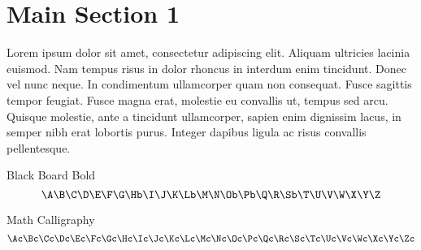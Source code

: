
\section{Main Section 1}

Lorem ipsum dolor sit amet, consectetur adipiscing elit. Aliquam ultricies lacinia euismod. Nam tempus risus in dolor rhoncus in interdum enim tincidunt. Donec vel nunc neque. In condimentum ullamcorper quam non consequat. Fusce sagittis tempor feugiat. Fusce magna erat, molestie eu convallis ut, tempus sed arcu. Quisque molestie, ante a tincidunt ullamcorper, sapien enim dignissim lacus, in semper nibh erat lobortis purus. Integer dapibus ligula ac risus convallis pellentesque.

\begin{namedtheorem}{Black Board Bold}
    \begin{equation*}
        \A \B \C \D \E \F \G \Hb \I \J \K \Lb \M \N \Ob \Pb \Q \R \Sb \T \U \V \W \X \Y \Z 
    \end{equation*}
\end{namedtheorem}

\begin{namedtheorem}{Math Calligraphy}
    \begin{equation*}
        \Ac \Bc \Cc \Dc \Ec \Fc \Gc \Hc \Ic \Jc \Kc \Lc \Mc \Nc \Oc \Pc \Qc \Rc \Sc \Tc \Uc \Vc \Wc \Xc \Yc \Zc
    \end{equation*}
\end{namedtheorem}